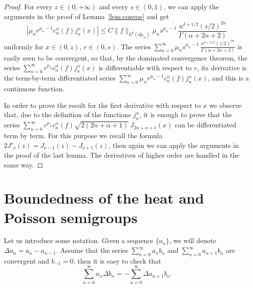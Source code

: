\documentclass[11pt,a4paper]{amsart}
\newcommand{\mua}{d\mu_\alpha}
\newcommand{\jna}{j_n^{\alpha}}
\newcommand{\cna}{c_n^{\alpha}}
\newcommand{\lpnorm}[3]{\|{#1}\|_{L^{#2}({#3})}} %
\theoremstyle{plain}
\theoremstyle{remark}
\begin{document}
\begin{proof}
For every $z \in (0,+\infty)$ and every $s \in (0,1)$, we can apply the arguments in the proof of Lemma~\ref{lem:convae} and get
\[
   | \mu_n r^{\mu_n-1} \cna(f)\jna(x) |
   \leq C \lpnorm{f}p{\mua} \mu_n s^{\mu_n-1}
   \,\frac{n^{\delta+1/2} (z/2)^{2n}}{\Gamma(\alpha+2n+2)}
\]
uniformly for $x \in (0,z)$, $r \in (0,s)$. The series
$
   \sum_{n=0}^\infty \mu_n s^{\mu_n-1}
   \,\frac{n^{\delta+1/2} (z/2)^{2n}}{\Gamma(\alpha+2n+2)}
$
is easily seen to be convergent, so that, by the dominated convergence theorem, the series $\sum_{n=0}^\infty r^{\mu_n} \cna(f)\jna(x)$ is differentiable with respect to $r$, its derivative is the term-by-term differentiated series
$
   \sum_{n=0}^\infty \mu_n r^{\mu_n-1} \cna(f)\jna(x)
$,
and this is a continuous function.

In order to prove the result for the first derivative with respect to $x$ we observe that, due to the definition of the functions $\jna$, it is enough to prove  that the series $\sum_{n=0}^\infty r^{\mu_n} \cna(f) \sqrt{2(2n+\alpha+1)}\, J_{2n+\alpha+1}(x)$ can be differentiated term by term. For this purpose we recall the formula $2J'_{\nu}(z) = J_{\nu-1}(z)-J_{\nu+1}(z)$, then again we can apply the arguments in the proof of the last lemma. 
The derivatives of higher order are handled in the same way.
\end{proof}


\section{Boundedness of the heat and Poisson semigroups}

Let us introduce some notation.
Given a sequence $\{a_n\}$, we will denote $\Delta a_n = a_n - a_{n-1}$.
Assume that the series $\sum_{n=0}^\infty a_n b_n$ and $\sum_{n=0}^\infty a_{n+1} b_n$ are convergent and $b_{-1}=0$, then it is easy to check that
\begin{equation}
\label{eq:anbn}
  \sum_{n=0}^\infty a_n \Delta b_n = - \sum_{n=0}^\infty \Delta a_{n+1} b_n.
\end{equation}
\end{document}

